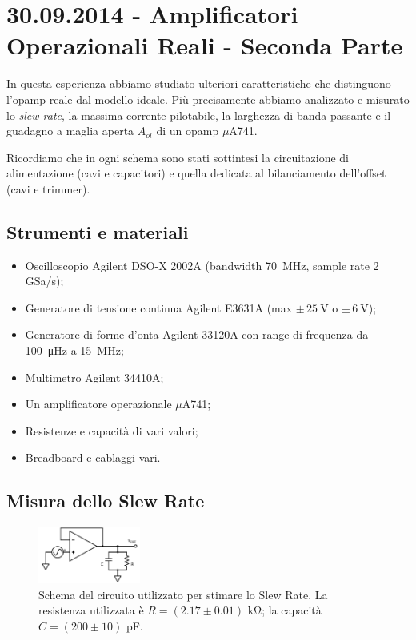 \section{30.09.2014 - Amplificatori Operazionali Reali - Seconda Parte}

In questa esperienza abbiamo studiato ulteriori caratteristiche che distinguono l'opamp reale dal modello ideale.
Più precisamente abbiamo analizzato e misurato lo \textit{slew rate}, la massima corrente pilotabile, la larghezza di banda passante e il guadagno a maglia aperta $A_{ol}$ di un opamp $\mu$A741.

Ricordiamo che in ogni schema sono stati sottintesi la circuitazione di alimentazione (cavi e capacitori) e quella dedicata al bilanciamento dell'offset (cavi e trimmer).

\subsection*{Strumenti e materiali}

\begin{itemize} [noitemsep]
\item Oscilloscopio Agilent DSO-X 2002A (bandwidth \SI{70}{\mega\hertz}, sample rate \num{2} GSa/s);
\item Generatore di tensione continua Agilent E3631A (max $\pm \, \SI{25}{\volt}$ o $\pm \, \SI{6}{\volt}$);
\item Generatore di forme d'onta Agilent 33120A con range di frequenza da \SI{100}{\micro\hertz} a \SI{15}{\mega\hertz};
\item Multimetro Agilent 34410A;
\item Un amplificatore operazionale $\mu$A741;
\item Resistenze e capacità di vari valori;
\item Breadboard e cablaggi vari.
\end{itemize}

\subsection{Misura dello Slew Rate}

\begin{figure}
  \begin{center}
    \includegraphics[width=0.30\textwidth]{../E03/latex/slew_rate.pdf}
  \end{center}
  \caption{Schema del circuito utilizzato per stimare lo Slew Rate. La resistenza utilizzata è $R=(2.17\pm0.01)$ \si{\kilo\ohm}; la capacità $C=(200 \pm 10)$ \si{\pico\farad}.}
  \label{cir3:slew_rate}
\end{figure}

